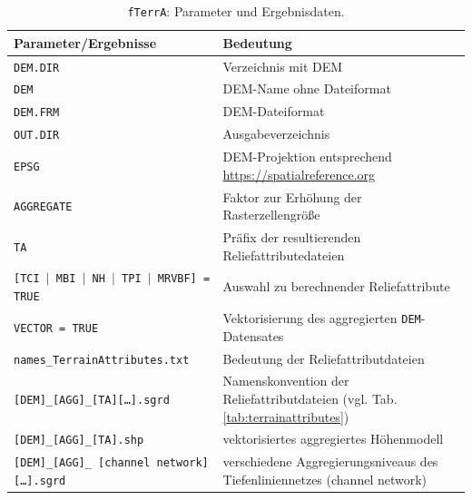 \begin{table}[t]
	\caption{\texttt{fTerrA}: Parameter und Ergebnisdaten.}
	\centering
	\begin{tabularx}{\textwidth}{X|X}
		\toprule
		\textbf{Parameter/Ergebnisse} & \textbf{Bedeutung} \\
		\midrule
		\texttt{DEM.DIR} & Verzeichnis mit DEM\\ \midrule
		\texttt{DEM} & DEM-Name ohne Dateiformat \\ \midrule
	    \texttt{DEM.FRM} & DEM-Dateiformat\\ \midrule
		\texttt{OUT.DIR} & Ausgabeverzeichnis\\\midrule
		\texttt{EPSG} & DEM-Projektion entsprechend \url{https://spatialreference.org}\\\midrule
		\texttt{AGGREGATE} & Faktor zur Erhöhung der Rasterzellengröße\\\midrule
		\texttt{TA} & Präfix der resultierenden Reliefattributedateien\\\midrule
		\texttt{[TCI $|$ MBI $|$ NH $|$ TPI $|$ MRVBF] = TRUE} & Auswahl zu berechnender Reliefattribute\\\midrule
		\texttt{VECTOR = TRUE} & Vektorisierung des aggregierten \texttt{DEM}-Datensates\\
		\midrule
		\texttt{names\_TerrainAttributes.txt} & Bedeutung der Reliefattributdateien\\\midrule\midrule
		\texttt{[DEM]\_\text{AGGREGATE}[AGG]\_[TA][\dots].sgrd} & Namenskonvention der Reliefattributdateien (vgl. Tab. \ref{tab:terrainattributes})\\\midrule
		\texttt{[DEM]\_\text{AGGREGATE}[AGG]\_[TA].shp} & vektorisiertes aggregiertes Höhenmodell\\\midrule
		\texttt{[DEM]\_\text{AGGREGATE}[AGG]\_ [channel network][\dots].sgrd} & verschiedene Aggregierungsniveaus des Tiefenliniennetzes (channel network)\\\bottomrule
	\end{tabularx}
	\label{tab:fTerrA}%
\end{table}


